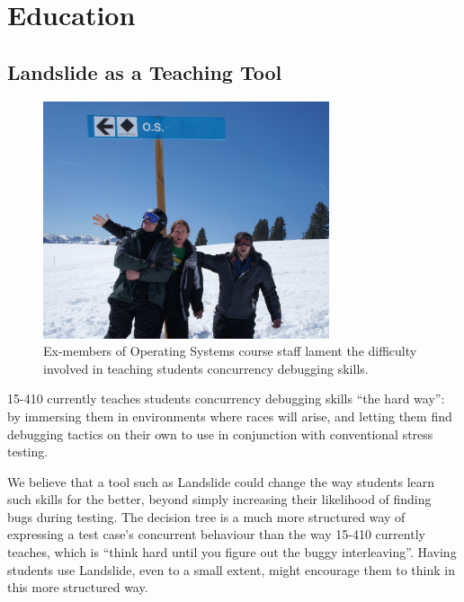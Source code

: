 \section{Education}
\label{sec:future-education}

\subsection{Landslide as a Teaching Tool}

\begin{figure}[h]
	\begin{center}
	\includegraphics[width=0.75\textwidth]{wont-modify-vail.jpg}
	\end{center}
	\caption{Ex-members of Operating Systems course staff lament the difficulty involved in teaching students concurrency debugging skills.}
\end{figure}

15-410 currently teaches students concurrency debugging skills ``the hard way'': by immersing them in environments where races will arise, and letting them find debugging tactics on their own to use in conjunction with conventional stress testing.

We believe that a tool such as Landslide could change the way students learn such skills for the better, beyond simply increasing their likelihood of finding bugs during testing. The decision tree is a much more structured way of expressing a test case's concurrent behaviour than the way 15-410 currently teaches, which is ``think hard until you figure out the buggy interleaving''. Having students use Landslide, even to a small extent, might encourage them to think in this more structured way.

